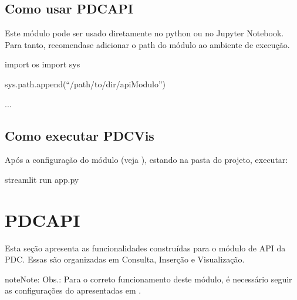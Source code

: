 \documentclass[letterpaper,10pt,brazil]{sphinxmanual}
\begin{document}
\section{Como usar PDC\sphinxhyphen{}API}
\label{\detokenize{usage:como-usar-pdc-api}}
\sphinxAtStartPar
Este módulo pode ser usado diretamente no python ou no Jupyter Notebook.
Para tanto, recomenda\sphinxhyphen{}se adicionar o path do módulo ao ambiente de execução.

\begin{sphinxVerbatim}[commandchars=\\\{\}]
import os
import sys

sys.path.append(“/path/to/dir/apiModulo”)

...
\end{sphinxVerbatim}


\section{Como executar PDC\sphinxhyphen{}Vis}
\label{\detokenize{usage:como-executar-pdc-vis}}
\sphinxAtStartPar
Após a configuração do módulo (veja {\hyperref[\detokenize{pdcvis:pdc-visualizacao}]{}}), estando na pasta do projeto, executar:

\begin{sphinxVerbatim}[commandchars=\\\{\}]
 streamlit run app.py
\end{sphinxVerbatim}

\sphinxstepscope


\chapter{PDC\sphinxhyphen{}API}
\label{\detokenize{api:pdc-api}}\label{\detokenize{api::doc}}
\sphinxAtStartPar
Esta seção apresenta as funcionalidades construídas para o módulo de API da PDC.
Essas são organizadas em Consulta, Inserção e Visualização.

\begin{sphinxadmonition}{note}{Note:}
\sphinxAtStartPar
Obs.: Para o correto funcionamento deste módulo, é necessário seguir as configurações
do  apresentadas em {\hyperref[\detokenize{usage:configurar-globals-py}]{}}.
\end{sphinxadmonition}
\end{document}
